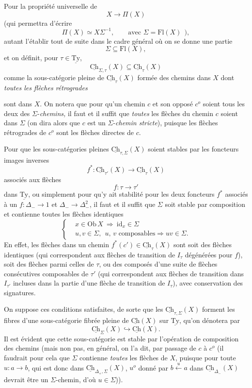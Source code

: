 \documentclass[11pt]{article}
\newcommand{\printedpage}[1]{\marginpar{\footnotesize p.~#1}}
\newcommand{\msp}[1]{\marginpar{\footnotesize [#1]}}
\newcommand{\uTy}{\underline{\mathrm{Ty}}}
\newcommand{\Ch}{\underline{\mathrm{Ch}}}
\newcommand{\Ty}{\underline{\mathrm{Ty}}}
\newcommand{\Fl}{\mathrm{Fl}}
\newcommand{\id}{\mathrm{id}}
\begin{document}
Pour la propriété universelle de
\[
X \longrightarrow \Pi(X)
\]
(qui permettra d'écrire
\[
\Pi(X) \simeq X\Sigma^{-1}, \qquad \text{avec } \Sigma = \Fl(X) \ \ ),
\]
autant l'établir tout de suite dans le cadre général où on se donne une partie
\[
\Sigma \subseteq \Fl(X),
\]
et on définit, pour $\tau \in \Ty$,
\[
\Ch_{\Sigma,\tau}(X) \subseteq \Ch_{\tau}(X)
\]
comme la sous-catégorie pleine de $\Ch_{\tau}(X)$ formée des chemins dans $X$ dont \textit{toutes les flèches rétrogrades}

\msp{page 66}

sont dans $X$. On notera que pour qu'un chemin $c$ et son opposé $c^o$ soient tous les deux des $\Sigma$-\textit{chemins,} il faut et il suffit que \textit{toutes} les flèches du chemin $c$ soient dans $\Sigma$ (on dira alors que $c$ est un $\Sigma$-\textit{chemin stricte}), puisque les flèches rétrogrades de $c^o$ sont les flèches directes de $c$.

Pour que les sous-catégories pleines $\Ch_{\tau,\Sigma}(X)$ soient stables par les foncteurs images inverses
\[
f^* : \Ch_{\tau'}(X) \longrightarrow \Ch_{\tau}(X)
\]
associés aux flèches
\[
f : \tau \longrightarrow \tau'
\]
dans $\uTy$, ou simplement pour qu'y ait stabilité pour les deux foncteurs $f^*$ associés à un $f : \Delta_- \longrightarrow 1$ et $\Delta_- \longrightarrow \Delta_-^2$, il faut et il suffit que $\Sigma$ soit stable par composition et contienne toutes les flèches identiques %
\[
\left\{
\begin{aligned}
& x \in \mathrm{Ob}\,X \ \Longrightarrow \ \id_x \in \Sigma \\
& u, v \in \Sigma, \ \ u,\, v \text{ composables} \Longrightarrow uv \in \Sigma.
\end{aligned}
\right.
\]
En effet, les flèches dans un chemin $f^*(c') \in \Ch_{\tau}(X)$ sont soit des flèches identiques (qui correspondent aux flèches de transition de $I_\tau$ dégénérées pour $f$), soit des flèches parmi celles de $\tau$, ou des composés d'une suite de flèches consécutives composables de $\tau'$ (qui correspondent aux flèches de transition dans $I_{\tau'}$ incluses dans la partie d'une flèche de transition de $I_\tau$), avec conservation des signatures.

\printedpage{45}

\msp{page 67}

On suppose ces conditions satisfaites, de sorte que les $\Ch_{\tau,\Sigma}(X)$ forment les fibres d'une sous-catégorie fibrée pleine de $\Ch(X)$ sur $\uTy$, qu'on dénotera par
\[
\Ch_{\Sigma}(X) \hookrightarrow \Ch(X).
\]
Il est évident que cette sous-catégorie est stable par l'opération de composition des chemins (mais non pas, en général, on l'a dit, par passage de $c$ à $c^o$ (il faudrait pour cela que $\Sigma$ contienne \textit{toutes} les flèches de $X$, puisque pour toute $u : a \longrightarrow b$, qui est donc dans $\Ch_{\Delta_+,\Sigma}(X)$, $u^o$ donné par $b \xleftarrow{\ u\ } a$ dans $\Ch_{\Delta_-}(X)$ devrait être un $\Sigma$-chemin, d'où $u \in \Sigma$)).
\end{document}

